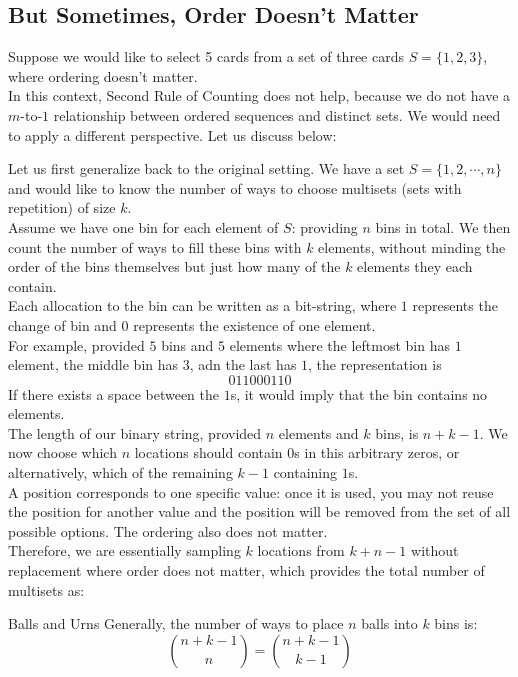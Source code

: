 \subsection{But Sometimes, Order Doesn't Matter}
Suppose we would like to select 5 cards from a set of three cards $S = \{1, 2, 3\}$, where ordering doesn't matter. \\
In this context, Second Rule of Counting does not help, because we do not have a $m$-to-$1$ relationship between ordered sequences and distinct sets. We would need to apply a different perspective. Let us discuss below:

Let us first generalize back to the original setting. We have a set $S = \{1, 2, \cdots, n\}$ and would like to know the number of ways to choose multisets (sets with repetition) of size $k$. \\
Assume we have one bin for each element of $S$: providing $n$ bins in total. We then count the number of ways to fill these bins with $k$ elements, without minding the order of the bins themselves but just how many of the $k$ elements they each contain. \\
Each allocation to the bin can be written as a bit-string, where $1$ represents the change of bin and $0$ represents the existence of one element. \\
For example, provided $5$ bins and $5$ elements where the leftmost bin has $1$ element, the middle bin has $3$, adn the last has $1$, the representation is
\[01 10001 10\]
If there exists a space between the $1$s, it would imply that the bin contains no elements. \\
The length of our binary string, provided $n$ elements and $k$ bins, is $n + k - 1$. We now choose which $n$ locations should contain $0$s in this arbitrary zeros, or alternatively, which of the remaining $k-1$ containing $1$s. \\
A position corresponds to one specific value: once it is used, you may not reuse the position for another value and the position will be removed from the set of all possible options. The ordering also does not matter. \\
Therefore, we are essentially sampling $k$ locations from $k + n - 1$ without replacement where order does not matter, which provides the total number of multisets as:
\begin{ln-theorem}{Balls and Urns}{}
    Generally, the number of ways to place $n$ balls into $k$ bins is:
    \[\binom{n + k - 1}{n} = \binom{n + k - 1}{k - 1}\]
\end{ln-theorem}

